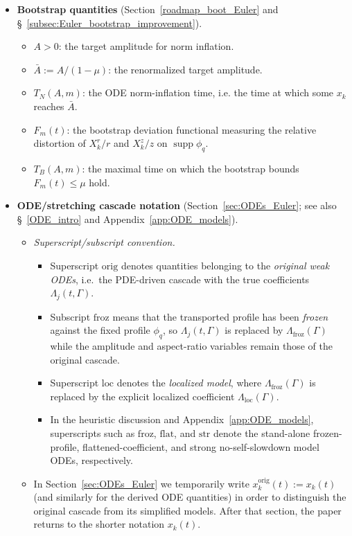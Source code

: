 \documentclass[reqno,11pt]{amsart}
\begin{document}
\begin{itemize}
\item \textbf{Bootstrap quantities}
(Section~\ref{roadmap_boot_Euler} and \S~\ref{subsec:Euler_bootstrap_improvement}).
\begin{itemize}
    \item $A>0$: the target amplitude for norm inflation.
    \item $\bar A:=A/(1-\mu)$: the renormalized target amplitude.
    \item $T_N(A,m)$: the ODE norm-inflation time, i.e. the time at which  some $x_k$ reaches $\bar A$.
    \item $F_m(t)$: the bootstrap deviation functional measuring the relative distortion of $X_k^r/r$ and $X_k^z/z$ on $\operatorname{supp}\phi_q$.
    \item $T_B(A,m)$: the maximal time on which the bootstrap bounds $F_m(t)\le \mu$ hold.
\end{itemize}
\item \textbf{ODE/stretching cascade notation}
(Section~\ref{sec:ODEs_Euler}; see also \S~\ref{ODE_intro} and Appendix~\ref{app:ODE_models}).
\begin{itemize}
    \item \emph{Superscript/subscript convention.}
    \begin{itemize}
        \item Superscript $\mathrm{orig}$ denotes quantities belonging to the \emph{original weak ODEs}, i.e.\ the PDE-driven cascade with the true coefficients $\Lambda_j(t,\Gamma)$.
        \item Subscript $\mathrm{froz}$ means that the transported profile has been \emph{frozen} against the fixed profile $\phi_q$, so $\Lambda_j(t,\Gamma)$ is replaced by $\Lambda_{\mathrm{froz}}(\Gamma)$ while the amplitude and aspect-ratio variables remain those of the original cascade.
        \item Superscript $\mathrm{loc}$ denotes the \emph{localized  model}, where $\Lambda_{\mathrm{froz}}(\Gamma)$ is replaced by the explicit localized coefficient $\Lambda_{\mathrm{loc}}(\Gamma)$.
        \item In the heuristic discussion and Appendix~\ref{app:ODE_models}, superscripts such as $\mathrm{froz}$, $\mathrm{flat}$, and $\mathrm{str}$ denote the stand-alone frozen-profile, flattened-coefficient, and strong no-self-slowdown model ODEs, respectively.
    \end{itemize}

    \item In Section~\ref{sec:ODEs_Euler} we temporarily write $x_k^{\mathrm{orig}}(t):=x_k(t)$
    (and similarly for the derived ODE quantities) in order to distinguish the original cascade from its simplified models. After that section, the paper returns to the shorter notation $x_k(t)$.


\end{itemize}
\end{itemize}
\end{document}
